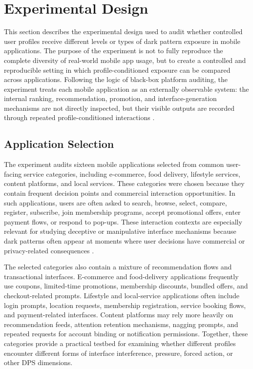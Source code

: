 \chapter{Experimental Design}
\label{sec:experimental-design}

This section describes the experimental design used to audit whether controlled user profiles receive different levels or types of dark pattern exposure in mobile applications. The purpose of the experiment is not to fully reproduce the complete diversity of real-world mobile app usage, but to create a controlled and reproducible setting in which profile-conditioned exposure can be compared across applications. Following the logic of black-box platform auditing, the experiment treats each mobile application as an externally observable system: the internal ranking, recommendation, promotion, and interface-generation mechanisms are not directly inspected, but their visible outputs are recorded through repeated profile-conditioned interactions \cite{sandvig2014auditing,hannak2013personalization,srba2023youtube}.

\section{Application Selection}
\label{subsec:application-selection}

The experiment audits sixteen mobile applications selected from common user-facing service categories, including e-commerce, food delivery, lifestyle services, content platforms, and local services. These categories were chosen because they contain frequent decision points and commercial interaction opportunities. In such applications, users are often asked to search, browse, select, compare, register, subscribe, join membership programs, accept promotional offers, enter payment flows, or respond to pop-ups. These interaction contexts are especially relevant for studying deceptive or manipulative interface mechanisms because dark patterns often appear at moments where user decisions have commercial or privacy-related consequences \cite{gray2018darkpatterns,mathur2019darkpatterns}.

The selected categories also contain a mixture of recommendation flows and transactional interfaces. E-commerce and food-delivery applications frequently use coupons, limited-time promotions, membership discounts, bundled offers, and checkout-related prompts. Lifestyle and local-service applications often include login prompts, location requests, membership registration, service booking flows, and payment-related interfaces. Content platforms may rely more heavily on recommendation feeds, attention retention mechanisms, nagging prompts, and repeated requests for account binding or notification permissions. Together, these categories provide a practical testbed for examining whether different profiles encounter different forms of interface interference, pressure, forced action, or other DPS dimensions.

